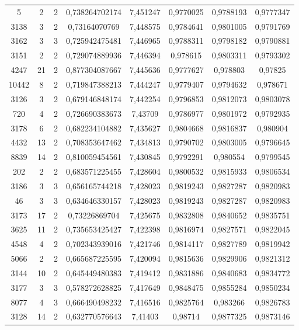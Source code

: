 \begin{longtable}{|c|c|c|c|c|c|c|c|}
5 & 2 & 2 & 0,738264702174 & 7,451247 & 0,9770025 & 0,9788193 & 0,9777347 \\
3138 & 3 & 2 & 0,73164070769 & 7,448575 & 0,9784641 & 0,9801005 & 0,9791769 \\
3162 & 3 & 3 & 0,725942475481 & 7,446965 & 0,9788311 & 0,9798182 & 0,9790881 \\
3151 & 2 & 2 & 0,729074889936 & 7,446394 & 0,978615 & 0,9803311 & 0,9793302 \\
4247 & 21 & 2 & 0,877304087667 & 7,445636 & 0,9777627 & 0,978803 & 0,97825 \\
10442 & 8 & 2 & 0,719847388213 & 7,444247 & 0,9779407 & 0,9794632 & 0,978671 \\
3126 & 3 & 2 & 0,679146848174 & 7,442254 & 0,9796853 & 0,9812073 & 0,9803078 \\
720 & 4 & 2 & 0,726690383673 & 7,43709 & 0,9786977 & 0,9801972 & 0,9792935 \\
3178 & 6 & 2 & 0,682234104882 & 7,435627 & 0,9804668 & 0,9816837 & 0,980904 \\
4432 & 13 & 2 & 0,708353647462 & 7,434813 & 0,9790702 & 0,9803005 & 0,9796645 \\
8839 & 14 & 2 & 0,810059454561 & 7,430845 & 0,9792291 & 0,980554 & 0,9799545 \\
202 & 2 & 2 & 0,683571225455 & 7,428604 & 0,9800532 & 0,9815933 & 0,9806534 \\
3186 & 3 & 3 & 0,656165744218 & 7,428023 & 0,9819243 & 0,9827287 & 0,9820983 \\
46 & 3 & 3 & 0,634646330157 & 7,428023 & 0,9819243 & 0,9827287 & 0,9820983 \\
3173 & 17 & 2 & 0,73226869704 & 7,425675 & 0,9832808 & 0,9840652 & 0,9835751 \\
3625 & 11 & 2 & 0,735653425427 & 7,422398 & 0,9816974 & 0,9827571 & 0,9822045 \\
4548 & 4 & 2 & 0,702343939016 & 7,421746 & 0,9814117 & 0,9827789 & 0,9819942 \\
5066 & 2 & 2 & 0,665687225595 & 7,420094 & 0,9815636 & 0,9829906 & 0,9821312 \\
3144 & 10 & 2 & 0,645449480383 & 7,419412 & 0,9831886 & 0,9840683 & 0,9834772 \\
3177 & 3 & 3 & 0,578272628825 & 7,417649 & 0,9848475 & 0,9855284 & 0,9850234 \\
8077 & 4 & 3 & 0,666490498232 & 7,416516 & 0,9825764 & 0,983266 & 0,9826783 \\
3128 & 14 & 2 & 0,632770576643 & 7,41403 & 0,98714 & 0,9877325 & 0,9873146 \\

\end{longtable}
